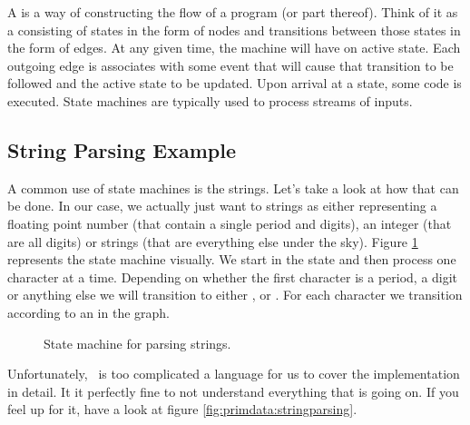 A  is a way of constructing the flow of a program (or part thereof). Think of it as a  consisting of states in the form of nodes and transitions between those states in the form of edges. At any given time, the machine will have on active state. Each outgoing edge is associates with some event that will cause that transition to be followed and the active state to be updated. Upon arrival at a state, some code is executed. State machines are typically used to process streams of inputs.

\subsection{String Parsing Example}

A common use of state machines is the  strings. Let's take a look at how that can be done. In our case, we actually just want to  strings as either representing a floating point number (that contain a single period and digits), an integer (that are all digits) or strings (that are everything else under the sky). Figure \ref{fig:primdata:statemachine} represents the state machine visually. We start in the  state and then process one character at a time. Depending on whether the first character is a period, a digit or anything else we will transition to either ,  or . For each character we transition according to an  in the graph.

\begin{figure}[tbp]
  
  \caption{State machine for parsing strings.}
  \label{fig:primdata:statemachine}
\end{figure}

Unfortunately, \csharp\ is too complicated a language for us to cover the implementation in detail. It it perfectly fine to not understand everything that is going on. If you feel up for it, have a look at figure \ref{fig:primdata:stringparsing}.

